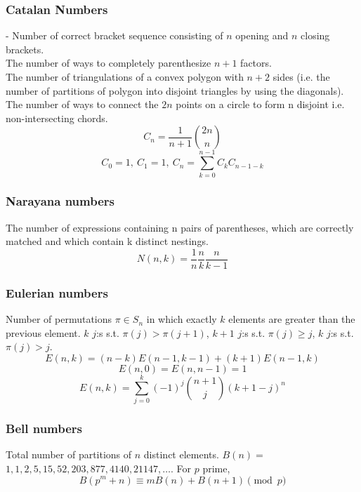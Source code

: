 \documentclass[
	a4paper,
	landscape,
	10pt,
]{article}
\begin{document}
\begin{multicols}{3}
	\subsubsection*{Catalan Numbers} - Number of correct bracket sequence consisting of $n$ opening and $n$
		closing brackets. \\
		The number of ways to completely parenthesize $n+1$ factors. \\
		The number of triangulations of a convex polygon with $n+2$
		sides (i.e. the number of partitions of polygon into disjoint triangles by using the diagonals). \\
		The number of ways to connect the $2n$
		points on a circle to form n disjoint i.e. non-intersecting chords.
		$$ C_n = \frac{1}{n+1} \binom{2n}{n}$$
		$$ C_0 = 1,~C_1 = 1, ~C_n = \sum_{k=0}^{n-1}C_k C_{n-1-k}  $$

	\subsubsection*{Narayana numbers} The number of expressions containing n pairs of parentheses, which are correctly matched and which contain k distinct nestings. 
		$$ N(n,k) = \frac{1}{n} \frac{n}{k} \frac{n}{k-1} $$

	\subsubsection*{Eulerian numbers}
		Number of permutations $\pi \in S_n$ in which exactly $k$ elements are greater than the previous element. $k$ $j$:s s.t. $\pi(j)>\pi(j+1)$, $k+1$ $j$:s s.t. $\pi(j)\geq j$, $k$ $j$:s s.t. $\pi(j)>j$.
		$$E(n,k) = (n-k)E(n-1,k-1) + (k+1)E(n-1,k)$$
		$$E(n,0) = E(n,n-1) = 1$$
		$$E(n,k) = \sum_{j=0}^k(-1)^j\binom{n+1}{j}(k+1-j)^n$$


	\subsubsection*{Bell numbers}
		Total number of partitions of $n$ distinct elements. $B(n) =$
		$1, 1, 2, 5, 15, 52, 203, 877, 4140, 21147, \dots$. For $p$ prime,
		\[ B(p^m+n)\equiv mB(n)+B(n+1) \pmod{p} \]


\end{multicols}
\end{document}
